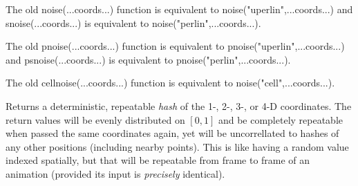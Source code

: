 \documentclass[11pt,letterpaper]{book}
\begin{document}
The old {\cf noise(...coords...)} function is equivalent to
{\cf noise("uperlin",...coords...)} and {\cf snoise(...coords...)}
is equivalent to {\cf noise("perlin",...coords...)}.
\apiend



The old {\cf pnoise(...coords...)} function is equivalent to
{\cf pnoise("uperlin",...coords...)} and {\cf psnoise(...coords...)}
is equivalent to {\cf pnoise("perlin",...coords...)}.
\apiend

The old {\cf cellnoise(...coords...)} function is equivalent to
{\cf noise("cell",...coords...)}.
\apiend

\NEW %
Returns a deterministic, repeatable \emph{hash} of the 1-, 2-, 3-, or
4-D coordinates.  The return values will be evenly
distributed on $[0,1]$ and be completely repeatable when passed the same
coordinates again, yet will be uncorrellated to hashes of any other
positions (including nearby points).  This is like having a random value
indexed spatially, but that will be repeatable from frame to frame of an
animation (provided its input is \emph{precisely} identical).
\apiend
\end{document}
